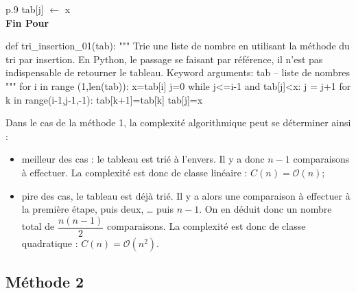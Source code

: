 \documentclass[10pt,fleqn]{article} %
\newcommand{\tsf}[1]{\small{\textsf{#1}}}
\begin{document}
\begin{pseudo}
\begin{minipage}[c]{.48\linewidth}
\begin{tabular}{p{.9\textwidth}}
\hspace{.8cm} \tsf{tab[j]} $\leftarrow$ \tsf{x} \\
\hspace{.4cm} \textbf{Fin Pour} \\
\hline
\end{tabular}
\end{minipage}\hfill
\begin{minipage}[c]{.48\linewidth}
\begin{python}
def tri_insertion_01(tab):
    """ 
    Trie une liste de nombre en utilisant la méthode 
    du tri par insertion.
    En Python, le passage se faisant par référence, il 
    n'est pas indispensable de retourner le tableau.
    Keyword arguments:
    tab -- liste de nombres
    """
    for i in range (1,len(tab)):
        x=tab[i]
        j=0
        while j<=i-1 and tab[j]<x:
            j = j+1
        for k in range(i-1,j-1,-1):
            tab[k+1]=tab[k]
        tab[j]=x
\end{python}
\end{minipage}

\end{pseudo}
 

Dans le cas de la méthode 1, la complexité algorithmique peut se déterminer ainsi : 
\begin{itemize}
\item meilleur des cas : le tableau est trié à l'envers. Il y a donc $n - 1$ comparaisons à effectuer. La complexité est donc de classe linéaire : $C(n)=\mathcal{O}(n)$;
\item pire des cas, le tableau est déjà trié. Il y a alors une comparaison à effectuer à la première étape, puis deux, … puis $n-1$. On en déduit donc un nombre total de $\dfrac{n\left(n-1\right)}{2}$ comparaisons. La complexité est donc de classe quadratique : $C(n)=\mathcal{O}\left(n^2\right)$.
\end{itemize}


\subsection{Méthode 2}
\end{document}
